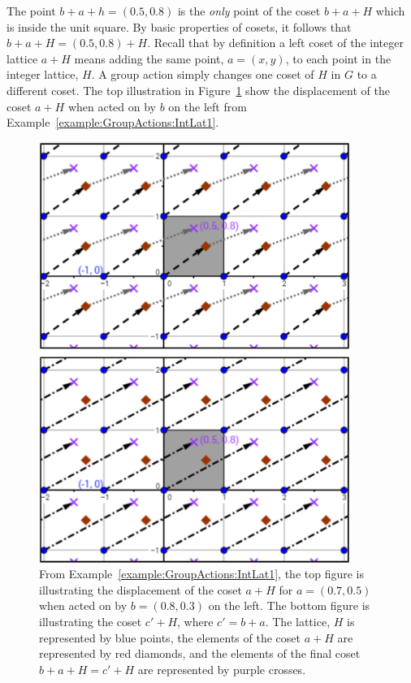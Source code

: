 The point $b+a+h=(0.5,0.8)$ is the \emph{only} point of the coset $b+a+H$ which is inside the unit square. By basic properties of cosets, it follows that $b+a+H =(0.5, 0.8)+H$. Recall that by definition a left coset of the integer lattice $a+H$ means adding the same point, $a=(x,y)$, to each point in the integer lattice, $H$. A group action simply changes one coset of $H$ in $G$ to a different coset.  The top illustration in Figure~\ref{fig:IntegerLattice1} show the displacement of the coset $a+H$ when acted on by $b$ on the left from Example~\ref{example:GroupActions:IntLat1}. 

\begin{figure}[htpb]
\begin{center}
\includegraphics[width=4.0in]{images/Lattice_baHcH.png}
\caption{From Example~\ref{example:GroupActions:IntLat1}, the top figure is illustrating the displacement of the coset $a+H$ for $a=(0.7,0.5)$ when acted on by $b=(0.8,0.3)$ on the left. The bottom figure is illustrating the coset $c'+H$, where $c'=b+a$. The lattice, $H$ is represented by blue points, the elements of the coset $a+H$ are represented by red diamonds, and the elements of the final coset $b+a+H=c'+H$ are represented by purple crosses.}
\label{fig:IntegerLattice1}
\end{center}
\end{figure}

